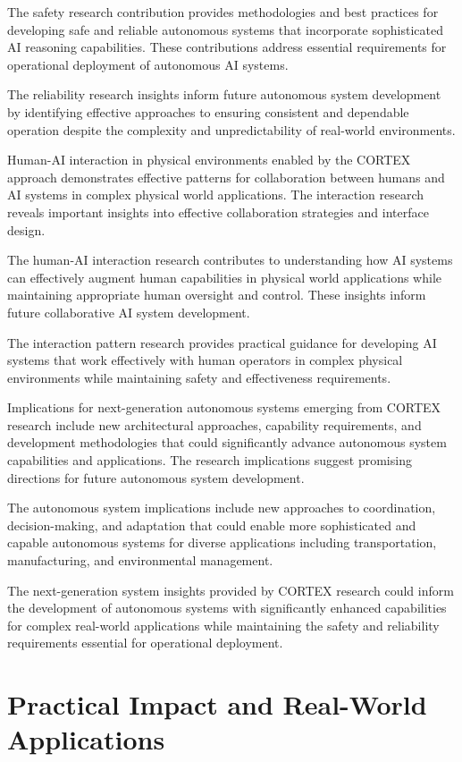 The safety research contribution provides methodologies and best practices for developing safe and reliable autonomous systems that incorporate sophisticated AI reasoning capabilities. These contributions address essential requirements for operational deployment of autonomous AI systems.

The reliability research insights inform future autonomous system development by identifying effective approaches to ensuring consistent and dependable operation despite the complexity and unpredictability of real-world environments.

Human-AI interaction in physical environments enabled by the CORTEX approach demonstrates effective patterns for collaboration between humans and AI systems in complex physical world applications. The interaction research reveals important insights into effective collaboration strategies and interface design.

The human-AI interaction research contributes to understanding how AI systems can effectively augment human capabilities in physical world applications while maintaining appropriate human oversight and control. These insights inform future collaborative AI system development.

The interaction pattern research provides practical guidance for developing AI systems that work effectively with human operators in complex physical environments while maintaining safety and effectiveness requirements.

Implications for next-generation autonomous systems emerging from CORTEX research include new architectural approaches, capability requirements, and development methodologies that could significantly advance autonomous system capabilities and applications. The research implications suggest promising directions for future autonomous system development.

The autonomous system implications include new approaches to coordination, decision-making, and adaptation that could enable more sophisticated and capable autonomous systems for diverse applications including transportation, manufacturing, and environmental management.

The next-generation system insights provided by CORTEX research could inform the development of autonomous systems with significantly enhanced capabilities for complex real-world applications while maintaining the safety and reliability requirements essential for operational deployment.

\section{Practical Impact and Real-World Applications}

